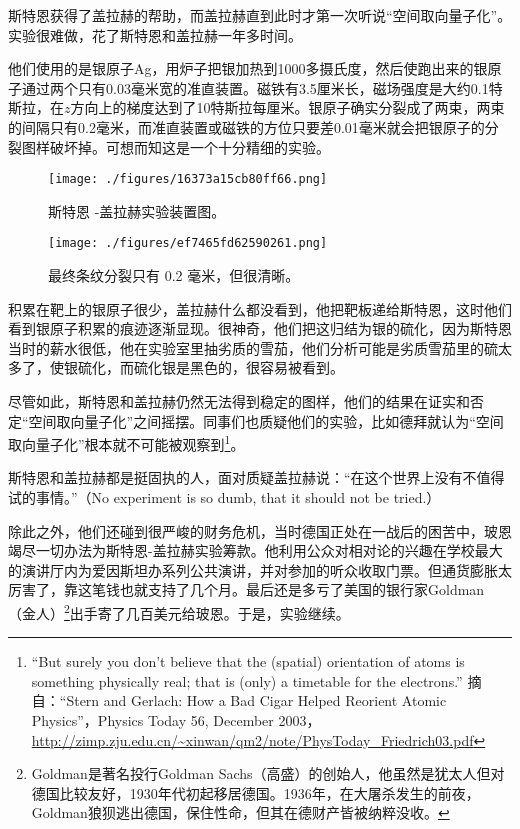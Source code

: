 斯特恩获得了盖拉赫的帮助，而盖拉赫直到此时才第一次听说“空间取向量子化”。实验很难做，花了斯特恩和盖拉赫一年多时间。

他们使用的是银原子Ag，用炉子把银加热到1000多摄氏度，然后使跑出来的银原子通过两个只有0.03毫米宽的准直装置。磁铁有3.5厘米长，磁场强度是大约0.1特斯拉，在$z$方向上的梯度达到了10特斯拉每厘米。银原子确实分裂成了两束，两束的间隔只有0.2毫米，而准直装置或磁铁的方位只要差0.01毫米就会把银原子的分裂图样破坏掉。可想而知这是一个十分精细的实验。

\begin{figure}[ht]
\centering
\texttt{[image: ./figures/16373a15cb80ff66.png]}
\caption{斯特恩 -盖拉赫实验装置图。} \label{fig_QMPre2_21}
\end{figure}
\begin{figure}[ht]
\centering
\texttt{[image: ./figures/ef7465fd62590261.png]}
\caption{最终条纹分裂只有 0.2 毫米，但很清晰。} \label{fig_QMPre2_22}
\end{figure}


积累在靶上的银原子很少，盖拉赫什么都没看到，他把靶板递给斯特恩，这时他们看到银原子积累的痕迹逐渐显现。很神奇，他们把这归结为银的硫化，因为斯特恩当时的薪水很低，他在实验室里抽劣质的雪茄，他们分析可能是劣质雪茄里的硫太多了，使银硫化，而硫化银是黑色的，很容易被看到。

尽管如此，斯特恩和盖拉赫仍然无法得到稳定的图样，他们的结果在证实和否定“空间取向量子化”之间摇摆。同事们也质疑他们的实验，比如德拜就认为“空间取向量子化”根本就不可能被观察到\footnote{“But surely you don’t believe that the (spatial) orientation of atoms is something physically real; that is (only) a timetable for the electrons.”  摘自：“Stern and Gerlach: How a Bad Cigar Helped Reorient Atomic Physics”，Physics Today 56, December 2003， \url{http://zimp.zju.edu.cn/~xinwan/qm2/note/PhysToday_Friedrich03.pdf} }。

斯特恩和盖拉赫都是挺固执的人，面对质疑盖拉赫说：“在这个世界上没有不值得试的事情。”（No experiment is so dumb, that it should not be tried.）

除此之外，他们还碰到很严峻的财务危机，当时德国正处在一战后的困苦中，玻恩竭尽一切办法为斯特恩-盖拉赫实验筹款。他利用公众对相对论的兴趣在学校最大的演讲厅内为爱因斯坦办系列公共演讲，并对参加的听众收取门票。但通货膨胀太厉害了，靠这笔钱也就支持了几个月。最后还是多亏了美国的银行家Goldman（金人）\footnote{Goldman是著名投行Goldman Sachs（高盛）的创始人，他虽然是犹太人但对德国比较友好，1930年代初起移居德国。1936年，在大屠杀发生的前夜，Goldman狼狈逃出德国，保住性命，但其在德财产皆被纳粹没收。}出手寄了几百美元给玻恩。于是，实验继续。

